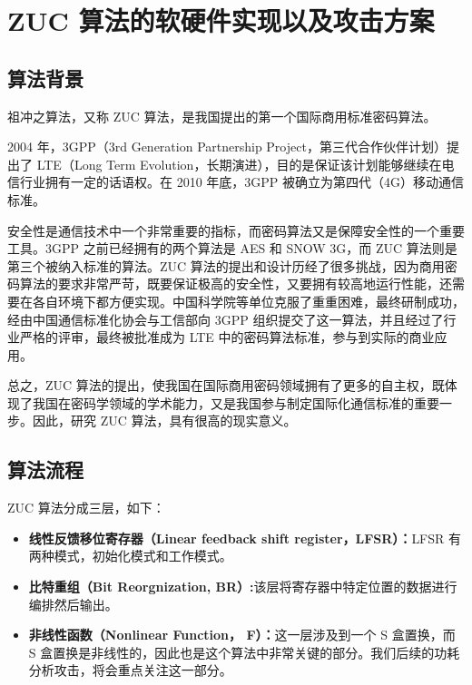 
\chapter{ZUC 算法的软硬件实现以及攻击方案}

\label{chap:zuc}

\section{算法背景} %
祖冲之算法，又称 ZUC 算法，是我国提出的第一个国际商用标准密码算法。

2004 年，3GPP（3rd Generation Partnership Project，第三代合作伙伴计划）提出了 LTE（Long Term Evolution，长期演进），目的是保证该计划能够继续在电信行业拥有一定的话语权。在 2010 年底，3GPP 被确立为第四代（4G）移动通信标准。 \cite{lte}

安全性是通信技术中一个非常重要的指标，而密码算法又是保障安全性的一个重要工具。3GPP 之前已经拥有的两个算法是 AES 和 SNOW 3G，而 ZUC 算法则是第三个被纳入标准的算法。ZUC 算法的提出和设计历经了很多挑战，因为商用密码算法的要求非常严苛，既要保证极高的安全性，又要拥有较高地运行性能，还需要在各自环境下都方便实现。中国科学院等单位克服了重重困难，最终研制成功，经由中国通信标准化协会与工信部向 3GPP 组织提交了这一算法，并且经过了行业严格的评审，最终被批准成为 LTE 中的密码算法标准，参与到实际的商业应用。 \cite{zuc_test}

总之，ZUC 算法的提出，使我国在国际商用密码领域拥有了更多的自主权，既体现了我国在密码学领域的学术能力，又是我国参与制定国际化通信标准的重要一步。因此，研究 ZUC 算法，具有很高的现实意义。

\section{算法流程} %

ZUC 算法分成三层，如下： \cite{zuc_standard}

\begin{itemize}
    \item \textbf{线性反馈移位寄存器（Linear feedback shift register，LFSR）：}LFSR 有两种模式，初始化模式和工作模式。
    \item \textbf{比特重组（Bit Reorgnization, BR）:}该层将寄存器中特定位置的数据进行编排然后输出。
    \item \textbf{非线性函数（Nonlinear Function， F）：}这一层涉及到一个 S 盒置换，而 S 盒置换是非线性的，因此也是这个算法中非常关键的部分。我们后续的功耗分析攻击，将会重点关注这一部分。
\end{itemize}

